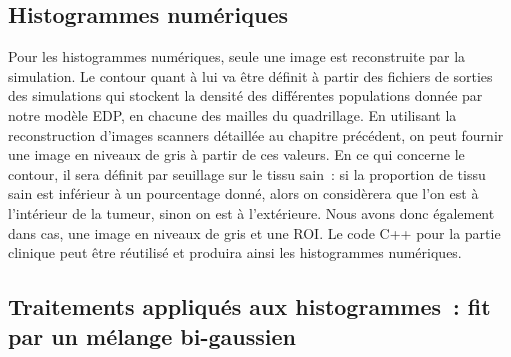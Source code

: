 \documentclass[main.tex]{subfiles}
\begin{document}
\subsection{Histogrammes numériques}
Pour les histogrammes numériques, seule une image est reconstruite par la simulation. Le contour quant à lui va être définit à partir des fichiers de sorties des simulations qui stockent la densité des différentes populations donnée par notre modèle EDP, en chacune des mailles du quadrillage.  En utilisant la reconstruction d'images scanners détaillée au chapitre précédent, on peut fournir une image en niveaux de gris à partir de ces valeurs. En ce qui concerne le contour, il sera définit par seuillage sur le tissu sain~: si la proportion de tissu sain est inférieur à un pourcentage donné, alors on considèrera que l'on est à l'intérieur de la tumeur, sinon on est à l'extérieure. Nous avons donc également dans cas, une image en niveaux de gris et une ROI. Le code C++ pour la partie clinique peut être réutilisé et produira ainsi les histogrammes numériques.

\subsection{Traitements appliqués aux histogrammes~: fit par un mélange bi-gaussien}
\end{document}
